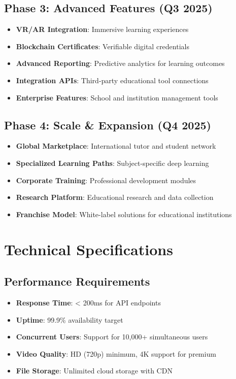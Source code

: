 \documentclass[11pt,a4paper]{article}
\begin{document}
\subsection{Phase 3: Advanced Features (Q3 2025)}
\begin{itemize}
    \item \textbf{VR/AR Integration}: Immersive learning experiences
    \item \textbf{Blockchain Certificates}: Verifiable digital credentials
    \item \textbf{Advanced Reporting}: Predictive analytics for learning outcomes
    \item \textbf{Integration APIs}: Third-party educational tool connections
    \item \textbf{Enterprise Features}: School and institution management tools
\end{itemize}

\subsection{Phase 4: Scale \& Expansion (Q4 2025)}
\begin{itemize}
    \item \textbf{Global Marketplace}: International tutor and student network
    \item \textbf{Specialized Learning Paths}: Subject-specific deep learning
    \item \textbf{Corporate Training}: Professional development modules
    \item \textbf{Research Platform}: Educational research and data collection
    \item \textbf{Franchise Model}: White-label solutions for educational institutions
\end{itemize}

\section{Technical Specifications}

\subsection{Performance Requirements}
\begin{itemize}
    \item \textbf{Response Time}: < 200ms for API endpoints
    \item \textbf{Uptime}: 99.9\% availability target
    \item \textbf{Concurrent Users}: Support for 10,000+ simultaneous users
    \item \textbf{Video Quality}: HD (720p) minimum, 4K support for premium
    \item \textbf{File Storage}: Unlimited cloud storage with CDN
\end{itemize}
\end{document}
